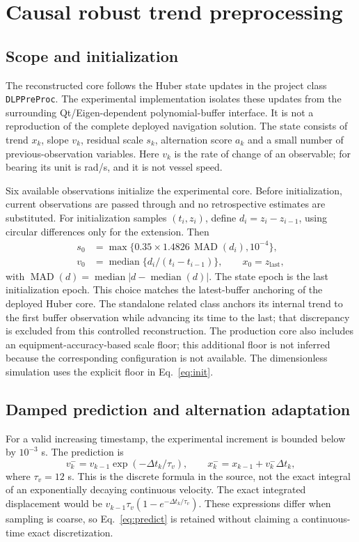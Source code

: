 \documentclass[12pt,a4paper]{article}
\newcommand{\MAD}{\operatorname{MAD}}
\newcommand{\med}{\operatorname{median}}
\begin{document}
\section{Causal robust trend preprocessing}
\subsection{Scope and initialization}
The reconstructed core follows the Huber state updates in the project class \texttt{DLPPreProc}. The experimental implementation isolates these updates from the surrounding Qt/Eigen-dependent polynomial-buffer interface. It is not a reproduction of the complete deployed navigation solution. The state consists of trend $x_k$, slope $v_k$, residual scale $s_k$, alternation score $a_k$ and a small number of previous-observation variables. Here $v_k$ is the rate of change of an observable; for bearing its unit is rad/s, and it is not vessel speed.

Six available observations initialize the experimental core. Before initialization, current observations are passed through and no retrospective estimates are substituted. For initialization samples $(t_i,z_i)$, define $d_i=z_i-z_{i-1}$, using circular differences only for the extension. Then
\begin{align}
 s_0&=\max\{0.35\times1.4826\,\MAD(d_i),10^{-4}\},\\
 v_0&=\med\{d_i/(t_i-t_{i-1})\},\qquad x_0=z_{\mathrm{last}},
 \label{eq:init}
\end{align}
with $\MAD(d)=\med|d-\med(d)|$. The state epoch is the last initialization epoch. This choice matches the latest-buffer anchoring of the deployed Huber core. The standalone related class anchors its internal trend to the first buffer observation while advancing its time to the last; that discrepancy is excluded from this controlled reconstruction. The production core also includes an equipment-accuracy-based scale floor; this additional floor is not inferred because the corresponding configuration is not available. The dimensionless simulation uses the explicit floor in Eq.~\eqref{eq:init}.

\subsection{Damped prediction and alternation adaptation}
For a valid increasing timestamp, the experimental increment is bounded below by $10^{-3}$ s. The prediction is
\begin{equation}
 v_k^-=v_{k-1}\exp(-\Delta t_k/\tau_v),\qquad
 x_k^-=x_{k-1}+v_k^-\Delta t_k,
 \label{eq:predict}
\end{equation}
where $\tau_v=12$ s. This is the discrete formula in the source, not the exact integral of an exponentially decaying continuous velocity. The exact integrated displacement would be $v_{k-1}\tau_v(1-e^{-\Delta t_k/\tau_v})$. These expressions differ when sampling is coarse, so Eq.~\eqref{eq:predict} is retained without claiming a continuous-time exact discretization.
\end{document}
